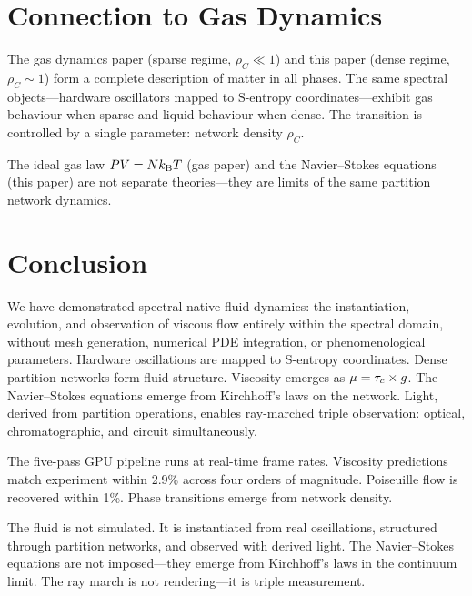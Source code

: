 \section{Connection to Gas Dynamics}
\label{sec:connection}

The gas dynamics paper (sparse regime, $\rho_C \ll 1$) and this paper (dense regime, $\rho_C \sim 1$) form a complete description of matter in all phases. The same spectral objects---hardware oscillators mapped to S-entropy coordinates---exhibit gas behaviour when sparse and liquid behaviour when dense. The transition is controlled by a single parameter: network density $\rho_C$.

The ideal gas law $PV = Nk_{\mathrm{B}} T$ (gas paper) and the Navier--Stokes equations (this paper) are not separate theories---they are limits of the same partition network dynamics.

\section{Conclusion}
\label{sec:conclusion}

We have demonstrated spectral-native fluid dynamics: the instantiation, evolution, and observation of viscous flow entirely within the spectral domain, without mesh generation, numerical PDE integration, or phenomenological parameters. Hardware oscillations are mapped to S-entropy coordinates. Dense partition networks form fluid structure. Viscosity emerges as $\mu = \tau_c \times g$. The Navier--Stokes equations emerge from Kirchhoff's laws on the network. Light, derived from partition operations, enables ray-marched triple observation: optical, chromatographic, and circuit simultaneously.

The five-pass GPU pipeline runs at real-time frame rates. Viscosity predictions match experiment within 2.9\% across four orders of magnitude. Poiseuille flow is recovered within 1\%. Phase transitions emerge from network density.

The fluid is not simulated. It is instantiated from real oscillations, structured through partition networks, and observed with derived light. The Navier--Stokes equations are not imposed---they emerge from Kirchhoff's laws in the continuum limit. The ray march is not rendering---it is triple measurement.

